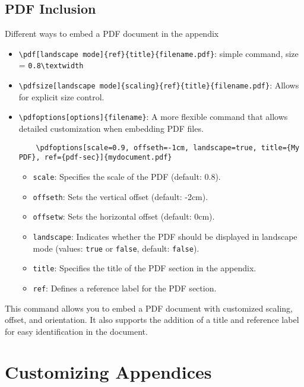 \documentclass[12pt,twoside]{report}
\begin{document}
\subsection*{PDF Inclusion}
Different ways to embed a PDF document in the appendix 
\begin{itemize}
    \item \verb|\pdf[landscape mode]{ref}{title}{filename.pdf}|: simple command, size = \verb|0.8\textwidth|
    \item \verb|\pdfsize[landscape mode]{scaling}{ref}{title}{filename.pdf}|: Allows for explicit size control.
    \item \verb|\pdfoptions[options]{filename}|: A more flexible command that allows detailed customization when embedding PDF files. 
    \begin{verbatim}
    \pdfoptions[scale=0.9, offseth=-1cm, landscape=true, title={My PDF}, ref={pdf-sec}]{mydocument.pdf}
    \end{verbatim}
    \begin{itemize}
        \item \texttt{scale}: Specifies the scale of the PDF (default: 0.8).
        \item \texttt{offseth}: Sets the vertical offset (default: -2cm).
        \item \texttt{offsetw}: Sets the horizontal offset (default: 0cm).
        \item \texttt{landscape}: Indicates whether the PDF should be displayed in landscape mode (values: \texttt{true} or \texttt{false}, default: \texttt{false}).
        \item \texttt{title}: Specifies the title of the PDF section in the appendix.
        \item \texttt{ref}: Defines a reference label for the PDF section.
    \end{itemize}
\end{itemize}










This command allows you to embed a PDF document with customized scaling, offset, and orientation. It also supports the addition of a title and reference label for easy identification in the document.


\section{Customizing Appendices}
\end{document}
